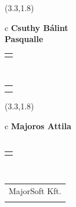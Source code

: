 \documentclass[11pt]{article}
\begin{document}
\makebox(3.3,1.8){
  \renewcommand\arraystretch{1.3}
  \begin{tabular}[c]{c}
    \hspace{8.5mm}
    \LARGE\bf{ Csuthy Bálint }\\
    \hspace{8.5mm}
    \Large{ Pasqualle }\\
    \renewcommand\arraystretch{3}
    \begin{tabular}[c]{c}
      \centering
      \fontfamily{phv}\selectfont{
        \textbf{
          \textsc{
            \scriptsize{
            \color{Bright}{ Ismerkedő }\color{Bright}{ Webmester }\color{Bright}{ Sminkmester }\color{Dark}{ Programozó }
            }
          }
        }
      }
    \end{tabular}
    \\
    \renewcommand\arraystretch{1}
    \begin{tabular}{p{3.3in}}
      \hspace{.7cm}\\
      \hspace{.7cm}\emph{  }\\
    \end{tabular}
  \end{tabular}
}

\makebox(3.3,1.8){
  \renewcommand\arraystretch{1.3}
  \begin{tabular}[c]{c}
    \hspace{8.5mm}
    \LARGE\bf{ Majoros Attila }\\
    \hspace{8.5mm}
    \Large{  }\\
    \renewcommand\arraystretch{3}
    \begin{tabular}[c]{c}
      \centering
      \fontfamily{phv}\selectfont{
        \textbf{
          \textsc{
            \scriptsize{
            \color{Dark}{ Ismerkedő }\color{Bright}{ Webmester }\color{Bright}{ Sminkmester }\color{Bright}{ Programozó }
            }
          }
        }
      }
    \end{tabular}
    \\
    \renewcommand\arraystretch{1}
    \begin{tabular}{p{3.3in}}
      \hspace{.7cm}MajorSoft Kft.\\
      \hspace{.7cm}\emph{  }\\
    \end{tabular}
  \end{tabular}
}
\end{document}

